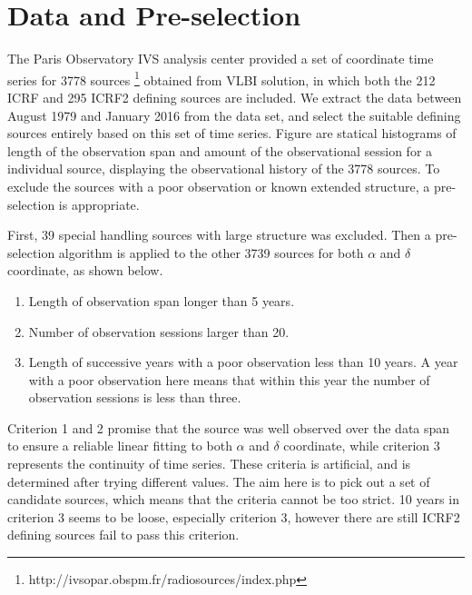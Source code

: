 \documentclass{aa}
\begin{document}
\section{Data and Pre-selection}
The Paris Observatory IVS analysis center provided a set of coordinate time series for 3778 sources 
\footnote{http://ivsopar.obspm.fr/radiosources/index.php} obtained from VLBI solution,
in which both the 212 ICRF and  295 ICRF2 defining sources are included. We extract the data between August 1979 and January 2016 from the data set, and select the suitable defining sources entirely based on this set of time series. 
Figure 
are statical histograms of length of the observation span and amount of the observational session for a individual source, displaying the observational history of the 3778 sources. To exclude the sources with a poor observation or known extended structure, a pre-selection is appropriate. 

First, 39 special handling sources with large structure\citep[see][]{2009ITN....35....1M} was excluded. Then a pre-selection algorithm is applied to the other 3739 sources for both $\alpha$ and $\delta$ coordinate, as shown below.
	\begin{enumerate}
      \item Length of observation span longer than 5 years.
      \item Number of observation sessions larger than 20.
	  \item Length of successive years with a poor observation less than 10 years. A year with a poor observation here means that within this year the number of observation sessions is less than three.
   \end{enumerate}

Criterion 1 and 2 promise that the source was well observed over the data span to ensure a reliable linear fitting to both $\alpha$ and $\delta$ coordinate, while criterion 3 represents the continuity of time series. These criteria is artificial, and is determined after trying different values. The aim here is to pick out a set of candidate sources, which means that the criteria cannot be too strict. 10 years in criterion 3 seems to be loose, especially criterion 3, however there are still 
ICRF2 defining sources fail to pass this criterion. 
\end{document}
